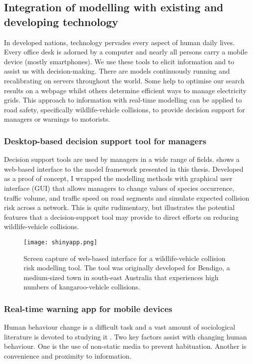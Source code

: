 \subsection{Integration of modelling with existing and developing technology}

In developed nations, technology pervades every aspect of human daily lives. Every office desk is adorned by a computer and nearly all persons carry a mobile device (mostly smartphones). We use these tools to elicit information and to assist us with decision-making. There are models continuously running and recalibrating on servers throughout the world. Some help to optimise our search results on a webpage whilst others determine efficient ways to manage electricity grids. This approach to information with real-time modelling can be applied to road safety, specifically wildlife-vehicle collisions, to provide decision support for managers or warnings to motorists.

\subsubsection{Desktop-based decision support tool for managers}

Decision support tools are used by managers in a wide range of fields.
 shows a web-based interface to the model framework presented in this thesis. Developed as a proof of concept, I wrapped the modelling methods with graphical user interface (GUI) that allows managers to change values of species occurrence, traffic volume, and traffic speed on road segments and simulate expected collision risk across a network. This is quite rudimentary, but illustrates the potential features that a decision-support tool may provide to direct efforts on reducing wildlife-vehicle collisions.

\begin{figure*}[htp]
  \centering
  \texttt{[image: shinyapp.png]}
  \caption[Decision support tool for wildlife-vehicle collisions]{Screen capture of web-based interface for a wildlife-vehicle collision risk modelling tool. The tool was originally developed for Bendigo, a medium-sized town in south-east Australia that experiences high numbers of kangaroo-vehicle collisions.}
  \label{wvc_tool}
\end{figure*}

\subsubsection{Real-time warning app for mobile devices}

Human behaviour change is a difficult task and a vast amount of sociological literature is devoted to studying it \citep{}.
Two key factors assist with changing human behaviour.
One is the use of non-static media to prevent habituation.
Another is convenience and proximity to information.
